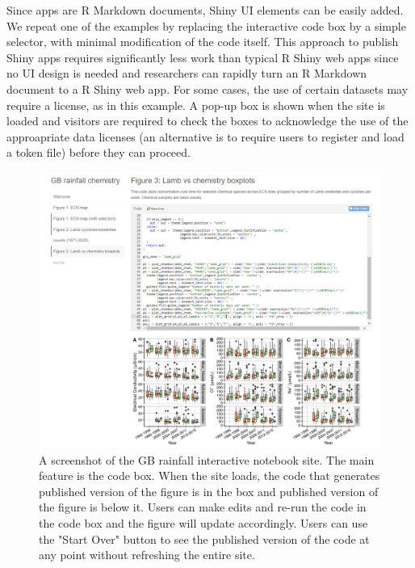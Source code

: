 Since  apps are R Markdown documents, Shiny UI elements
can be easily added. We repeat one of the examples by replacing the
interactive code box by a simple selector, with minimal modification of
the code itself. This approach to publish Shiny apps requires
significantly less work than typical R Shiny web apps since no UI design
is needed and researchers can rapidly turn an R Markdown document to a R
Shiny web app. For some cases, the use of certain datasets may require a
license, as in this example. A pop-up box is shown when the site is
loaded and visitors are required to check the boxes to acknowledge the
use of the approapriate data licenses (an alternative is to require
users to register and load a token file) before they can proceed.

\begin{Schunk}
\begin{figure}
\includegraphics[width=\textwidth]{GB_notebook_screenshot} \caption[A screenshot of the GB rainfall interactive notebook site]{A screenshot of the GB rainfall interactive notebook site. The main feature is the code box. When the site loads, the code that generates published version of the figure is in the box and published version of the figure is below it. Users can make edits and re-run the code in the code box and the figure will update accordingly. Users can use the "Start Over" button to see the published version of the code at any point without refreshing the entire site.}\label{fig:fig2}
\end{figure}
\end{Schunk}


